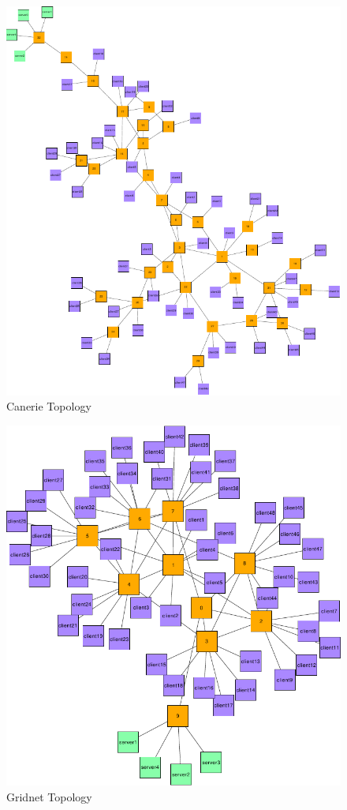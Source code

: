 \begin{figure}[htbp]
    \centering
    \includegraphics[width=\linewidth]{Networks/Canerie_final.pdf}
    \caption{Canerie Topology}
    \label{fig:Canerie}
\end{figure}

\begin{figure}[htbp]
    \centering
    \includegraphics[width=\linewidth]{Networks/Gridnet_final.pdf}
    \caption{Gridnet Topology}
    \label{fig:Gridnet}
\end{figure}

